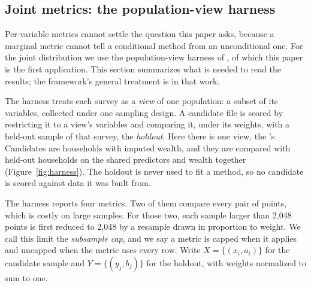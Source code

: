 \subsection{Joint metrics: the population-view harness}
\label{sec:harness}

Per-variable metrics cannot settle the question this paper asks, because a
marginal metric cannot tell a conditional method from an unconditional one.
For the joint distribution we use the population-view harness of
\citet{ghenis2026popdgp}, of which this paper is the first application. This
section summarizes what is needed to read the results; the framework's
general treatment is in that work.


The harness treats each survey as a \emph{view} of one population: a subset
of its variables, collected under one sampling design. A candidate file is
scored by restricting it to a view's variables and comparing it, under its
weights, with a held-out sample of that survey, the \emph{holdout}. Here
there is one view, the \scf{}'s. Candidates are \cps{} households with
imputed wealth, and they are compared with held-out \scf{} households on the
shared predictors and wealth together (Figure~\ref{fig:harness}). The
holdout is never used to fit a method, so no candidate is scored against
data it was built from.

The harness reports four metrics. Two of them compare every pair of points,
which is costly on large samples. For those two, each sample larger than
2,048 points is first reduced to 2,048 by a resample drawn in proportion to
weight. We call this limit the \emph{subsample cap}, and we say a metric is
capped when it applies and uncapped when the metric uses every row. Write
$X = \{(x_i, a_i)\}$ for the candidate sample and $Y = \{(y_j, b_j)\}$ for
the holdout, with weights normalized to sum to one.

